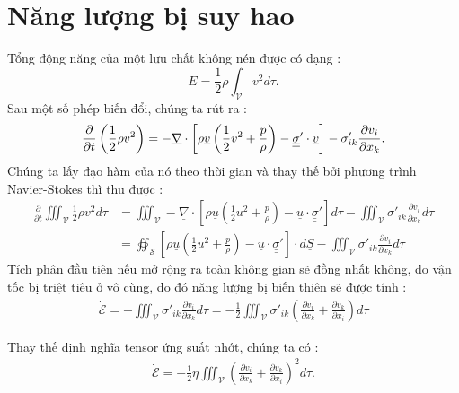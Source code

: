 \documentclass[CO_LUU_CHAT.tex]{subfiles}
\begin{document}
\section{Năng lượng bị suy hao}
Tổng động năng của một lưu chất không nén được có dạng :
$$
E=\frac{1}{2}\rho\int_{\mathcal{V}} v^2d\tau.
$$
Sau một số phép biến đổi, chúng ta rút ra :
\begin{equation}
    \begin{aligned}
        \frac{\partial}{\partial t}\left(\frac{1}{2}\rho v^2\right)=
        -\underline{\nabla}\cdot\left[\rho\underline{v}\left(\frac{1}{2}v^2+\frac{p}{\rho}\right)-\underline{\underline{\sigma}}'\cdot\underline{v}\right]-\sigma'_{ik}\frac{\partial v_i}{\partial x_k}.
    \end{aligned}
\end{equation}
Chúng ta lấy đạo hàm của nó theo thời gian và thay thế bởi phương trình Navier-Stokes thì thu được :
$$
\begin{aligned}
	\frac{\partial}{\partial t}\iiint_{\mathscr{V}}\frac{1}{2}\rho {v^2}d\tau&=\iiint_{\mathscr{V}}-\underline\nabla\cdot\left[\rho \underline u \left( {\frac{1}{2}{u^2} + \frac{p}{\rho }} \right) - \underline u  \cdot \underline{\underline \sigma } '\right]d\tau-\iiint_{\mathscr{V}}{\sigma {'_{ik}}\frac{{\partial {v_i}}}{{\partial {x_k}}}d\tau }\\
	&=\oiint_{\mathscr{S}}\left[\rho \underline u \left( {\frac{1}{2}{u^2} + \frac{p}{\rho }} \right) - \underline u  \cdot \underline{\underline \sigma } '\right]\cdot d\underline{S}-\iiint_{\mathscr{V}}{\sigma {'_{ik}}\frac{{\partial {v_i}}}{{\partial {x_k}}}d\tau }
\end{aligned}
$$
Tích phân đầu tiên nếu mở rộng ra toàn không gian sẽ đồng nhất không, do vận tốc bị triệt tiêu ở vô cùng, do đó năng lượng bị biến thiên sẽ được tính :
$$
\begin{aligned}
	\dot{\mathcal{E}}=-\iiint_{\mathscr{V}}{\sigma {'_{ik}}\frac{{\partial {v_i}}}{{\partial {x_k}}}d\tau}=-\frac{1}{2}\iiint_{\mathscr{V}}{\sigma {'_{ik}}\left(\frac{{\partial {v_i}}}{{\partial {x_k}}}+\frac{{\partial {v_k}}}{{\partial {x_i}}}\right)d\tau}
\end{aligned}
$$

Thay thế định nghĩa tensor ứng suất nhớt, chúng ta có :
\begin{equation}
	\begin{aligned}
	\boxed{	
		\dot{\mathcal{E}}=-\frac{1}{2}\eta\iiint_{\mathscr{V}}\left(\frac{{\partial {v_i}}}{{\partial {x_k}}}+\frac{{\partial {v_k}}}{{\partial {x_i}}}\right)^2d\tau
	}.
	\end{aligned}
\end{equation}
\end{document}
